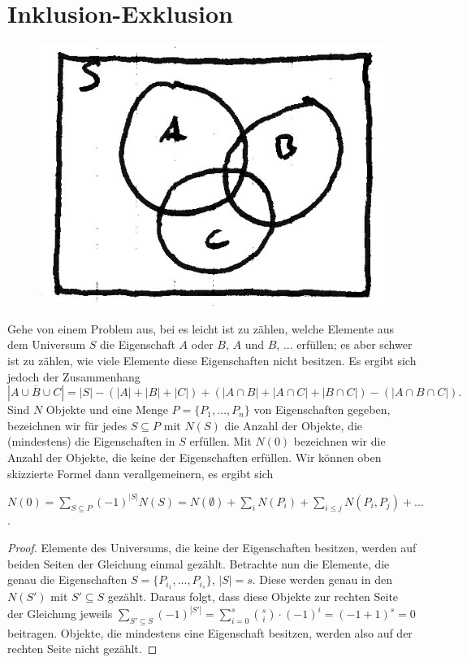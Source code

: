 \chapter{Inklusion-Exklusion}

  \begin{figure}[h]
    \centering
    \includegraphics[width=.25\textwidth]{./Bilder/b03.jpg}
  \end{figure}
  
  Gehe von einem Problem aus, bei es leicht ist zu zählen, welche Elemente aus dem Universum \(S\) die Eigenschaft \(A\) oder \(B\), \(A\) und \(B\), ... erfüllen; es aber schwer ist zu zählen, wie viele Elemente diese Eigenschaften nicht besitzen. Es ergibt sich jedoch der Zusammenhang
  \[
    | \overline{A \cup B \cup C} | = |S| - ( |A| + |B| + |C| ) + ( |A \cap B| + |A \cap C| + |B \cap C| ) - ( | A \cap B \cap C | ).
  \]
  Sind \(N\) Objekte und eine Menge \(P = \{ P_1,\dots,P_n \}\) von Eigenschaften gegeben, bezeichnen wir für jedes \(S \subseteq P\) mit \(N(S)\) die Anzahl der Objekte, die (mindestens) die Eigenschaften in \(S\) erfüllen. Mit \(N(0)\) bezeichnen wir die Anzahl der Objekte, die keine der Eigenschaften erfüllen. Wir können oben skizzierte Formel dann verallgemeinern, es ergibt sich
  
  \begin{theorem} \label{satzInklSumme}
    \(N(0) = \sum_{S \subseteq P} (-1)^{|S|} N(S) = N(\emptyset) + \sum_i N(P_i) + \sum_{i \leq j} N(P_i, P_j) + ...\).
  \end{theorem}
  
  \begin{proof}
    Elemente des Universums, die keine der Eigenschaften besitzen, werden auf beiden Seiten der Gleichung einmal gezählt. Betrachte nun die Elemente, die genau die Eigenschaften \(S = \{ P_{i_1}, ..., P_{i_s}\}\), \(|S| = s\). Diese werden genau in den \(N(S')\) mit \(S' \subseteq S\) gezählt. Daraus folgt, dass diese Objekte zur rechten Seite der Gleichung jeweils \( \sum_{S' \subseteq S} (-1)^{|S'|} = \sum_{i=0}^s \binom{s}{i} \cdot (-1)^i = (-1 + 1)^s = 0\) beitragen. Objekte, die mindestens eine Eigenschaft besitzen, werden also auf der rechten Seite nicht gezählt.
  \end{proof}
  
